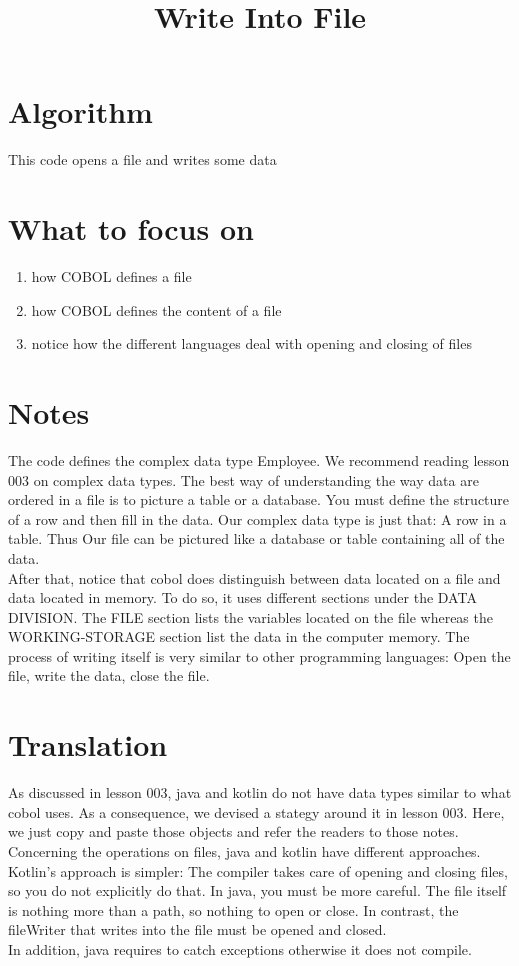 \documentclass[letterpaper,12pt]{article}
\begin{document}
\title{Write Into File} 
\maketitle

\section{Algorithm}
This code opens a file and writes some data

\section{What to focus on}
\begin{enumerate}
    \item how COBOL defines a file
    \item how COBOL defines the content of a file
    \item notice how the different languages deal with opening and closing of files
\end{enumerate}


\section{Notes}
The code defines the complex data type Employee. We recommend reading lesson 003 on complex data types. The best way of understanding the way data are ordered in a file 
is to picture a table or a database. You must define the structure of a row and then fill in the data. Our complex data type is just that: A row in a table. Thus Our file
can be pictured like a database or table containing all of the data. \\
After that, notice that cobol does distinguish between data located on a file and data located in 
memory. To do so, it uses different sections under the DATA DIVISION. The FILE section lists the variables located on the file whereas the WORKING-STORAGE section list the
data in the computer memory. The process of writing itself is very similar to other programming languages: Open the file, write the data, close the file.

\section{Translation}
As discussed in lesson 003, java and kotlin do not have data types similar to what cobol uses. As a consequence, we devised a stategy around it in lesson 003. 
Here, we just copy and paste those objects and refer the readers to those notes.\\
Concerning the operations on files, java and kotlin have different approaches. Kotlin's approach is simpler: The compiler takes care of opening and closing files, 
so you do not explicitly do that. In java, you must be more careful. The file itself is nothing more than a path, so nothing to open or close. 
In contrast, the fileWriter that writes into the file must be opened and closed.\\
In addition, java requires to catch exceptions otherwise it does not compile.
\end{document}
